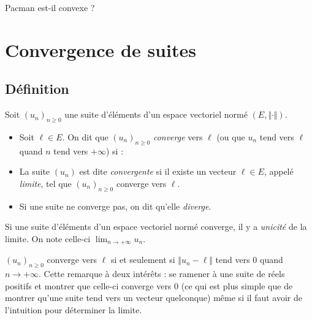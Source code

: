 \documentclass[a4paper,10pt]{report}
\begin{document}
\begin{ApplicationDirecte} Pacman est-il convexe ?
\end{ApplicationDirecte} 

\section{Convergence de suites}
\subsection{Définition}
\begin{Definition}{} Soit $(u_n)_{n \geq 0}$ une suite d'éléments d'un espace vectoriel normé $(E, \Vert \cdot \Vert)$.

\begin{itemize}
\item Soit $\ell \in E$. On dit que $(u_n)_{ n\geq 0}$ \emph{converge} vers $\ell$ (ou que $u_n$ tend vers $\ell$ quand $n$ tend vers $+ \infty$) si :

\vspace{1cm}

\item La suite $(u_n)$ est dite \emph{convergente} si il existe un vecteur $\ell \in E$, appelé \emph{limite}, tel que $(u_n)_{n \geq 0}$ converge vers $\ell$.
\item Si une suite ne converge pas, on dit qu'elle \emph{diverge}.
\end{itemize}
\end{Definition}

\begin{Theoreme}{} Si une suite d'éléments d'un espace vectoriel normé converge, il y a \emph{unicité} de la limite. On note celle-ci $\lim_{n \rightarrow + \infty} u_n$.
\end{Theoreme}

\begin{Remarque}{} $(u_n)_{n \geq 0}$ converge vers $\ell$ si et seulement si $\Vert u_n - \ell \Vert$ tend vers $0$ quand $n \rightarrow + \infty$.  Cette remarque à deux intérêts : se ramener à une suite de réels positifs et montrer que celle-ci converge vers $0$ (ce qui est plus simple que de montrer qu'une suite tend vers un vecteur quelconque) même si il faut avoir de l'intuition pour déterminer la limite.
\end{Remarque}
\end{document}
